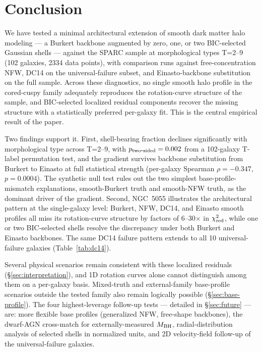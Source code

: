 \section{Conclusion}
\label{sec:conclusion}

We have tested a minimal architectural extension of smooth dark matter halo modeling --- a Burkert backbone augmented by zero, one, or two BIC-selected Gaussian shells --- against the SPARC sample at morphological types T=2--9 (102 galaxies, 2334 data points), with comparison runs against free-concentration NFW, DC14 on the universal-failure subset, and Einasto-backbone substitution on the full sample. Across these diagnostics, no single smooth halo profile in the cored-cuspy family adequately reproduces the rotation-curve structure of the sample, and BIC-selected localized residual components recover the missing structure with a statistically preferred per-galaxy fit. This is the central empirical result of the paper.

Two findings support it. First, shell-bearing fraction declines significantly with morphological type across T=2--9, with $p_{\rm two\mbox{-}sided} = 0.002$ from a 102-galaxy T-label permutation test, and the gradient survives backbone substitution from Burkert to Einasto at full statistical strength (per-galaxy Spearman $\rho = -0.347$, $p = 0.0004$). The synthetic null test rules out the two simplest base-profile-mismatch explanations, smooth-Burkert truth and smooth-NFW truth, as the dominant driver of the gradient. Second, NGC~5055 illustrates the architectural pattern at the single-galaxy level: Burkert, NFW, DC14, and Einasto smooth profiles all miss its rotation-curve structure by factors of 6--30$\times$ in $\chi^2_{\rm red}$, while one or two BIC-selected shells resolve the discrepancy under both Burkert and Einasto backbones. The same DC14 failure pattern extends to all 10 universal-failure galaxies (Table~\ref{tab:dc14}).

Several physical scenarios remain consistent with these localized residuals (\S\ref{sec:interpretation}), and 1D rotation curves alone cannot distinguish among them on a per-galaxy basis. Mixed-truth and external-family base-profile scenarios outside the tested family also remain logically possible (\S\ref{sec:base-profile}). The four highest-leverage follow-up tests --- detailed in \S\ref{sec:future} --- are: more flexible base profiles (generalized NFW, free-shape backbones), the \citet{ReinesGreeneGeha2013} dwarf-AGN cross-match for externally-measured $M_{\rm BH}$, radial-distribution analysis of selected shells in normalized units, and 2D velocity-field follow-up of the universal-failure galaxies.

